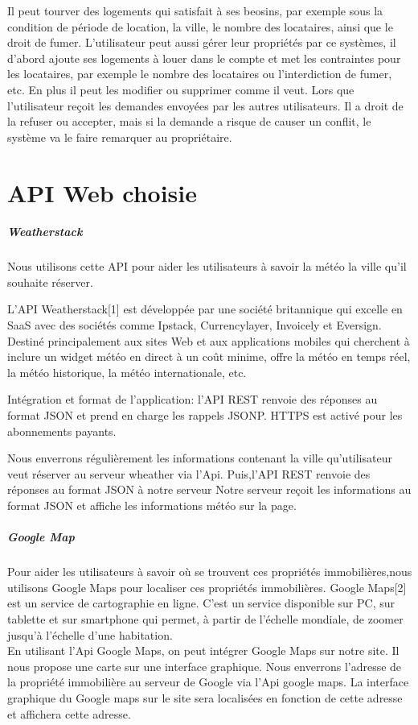 \documentclass[14px]{article}
\begin{document}
Il peut tourver des logements qui satisfait à ses beosins, par exemple sous la condition de période de location, la ville, le nombre des locataires, ainsi que le droit de fumer.
L'utilisateur peut aussi gérer leur propriétés par ce systèmes, il d'abord ajoute ses logements à louer dans le compte et met les contraintes pour les locataires, par exemple le nombre des locataires ou l'interdiction de fumer, etc. En plus il peut les modifier ou supprimer comme il veut. Lors que l'utilisateur reçoit les demandes envoyées par les autres utilisateurs. Il a droit de la refuser ou accepter, mais si la demande a risque de causer un conflit, le système va le faire remarquer au propriétaire.


\section{API Web choisie}
\subparagraph{Weatherstack}
Nous utilisons cette API pour aider les utilisateurs à savoir la météo la ville qu'il souhaite réserver.

L'API Weatherstack[1] est développée par une société britannique qui excelle en SaaS avec des sociétés comme Ipstack, Currencylayer, Invoicely et Eversign. Destiné principalement aux sites Web et aux applications mobiles qui cherchent à inclure un widget météo en direct à un coût minime, offre la météo en temps réel, la météo historique, la météo internationale, etc.

Intégration et format de l'application: l'API REST renvoie des réponses au format JSON et prend en charge les rappels JSONP. HTTPS est activé pour les abonnements payants.

Nous enverrons régulièrement les informations contenant la ville qu'utilisateur veut réserver au serveur wheather via l'Api. Puis,l'API REST renvoie des réponses au format JSON à notre serveur Notre serveur reçoit les informations au format JSON et affiche les informations météo sur la page.

\subparagraph{Google Map}
Pour aider les utilisateurs à savoir où se trouvent ces propriétés immobilières,nous utilisons Google Maps pour localiser ces propriétés immobilières.
Google Maps[2] est un service de cartographie en ligne. C'est un service disponible sur PC, sur tablette et sur smartphone qui permet, à partir de l'échelle mondiale, de zoomer jusqu'à l'échelle d'une habitation.\\
En utilisant l'Api Google Maps, on peut intégrer Google Maps sur notre site. Il nous propose une carte sur une interface graphique. Nous enverrons l'adresse de la propriété immobilière au serveur de Google via l'Api google maps. La interface graphique du Google maps sur le site sera localisées en fonction de cette adresse et affichera cette adresse.
\end{document}
